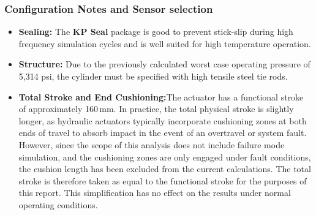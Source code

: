 \documentclass[
bindingoffset=5mm,  %
footnoteindent=3mm, %
hyphenation=true    %
]{src/wut-thesis}
\begin{document}
	\subsubsection{Configuration Notes and Sensor selection}
	\begin{itemize}
		\item \textbf{Sealing:} The \textbf{KP Seal} package is good to prevent stick-slip during high frequency simulation cycles and is well suited for high temperature operation.
		\item \textbf{Structure:} Due to the previously calculated worst case operating pressure of 5,314 psi, the cylinder must be specified with high tensile steel tie rods.
		\item \textbf{Total Stroke and End Cushioning:}The actuator has a functional stroke of approximately 160\,mm. In practice, the total physical stroke is slightly longer, as hydraulic actuators typically incorporate cushioning zones at both ends of travel to absorb impact in the event of an overtravel or system fault. However, since the scope of this analysis does not include failure mode simulation, and the cushioning zones are only engaged under fault conditions, the cushion length has been excluded from the current calculations. The total stroke is therefore taken as equal to the functional stroke for the purposes of this report. This simplification has no effect on the results under normal operating conditions.
		

\end{itemize}
\end{document}
